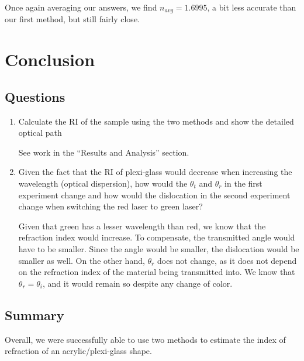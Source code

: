 \documentclass[
	letterpaper, %
	10pt, %
]{CSUniSchoolLabReport}
\begin{document}
Once again averaging our answers, we find $n_{avg}=1.6995$, a bit less accurate than our first method, but still fairly close.

\section{Conclusion}

\subsection{Questions}

\begin{enumerate}

  \item Calculate the RI of the sample using the two methods and show the detailed optical path

    See work in the ``Results and Analysis'' section.

  \item Given the fact that the RI of plexi-glass would decrease when increasing the wavelength (optical dispersion), how would the $\theta_t$ and $\theta_r$ in the first experiment change and how would the dislocation in the second experiment change when switching the red laser to green laser?

    Given that green has a lesser wavelength than red, we know that the refraction index would increase. To compensate, the transmitted angle would have to be smaller. Since the angle would be smaller, the dislocation would be smaller as well. On the other hand, $\theta_r$ does not change, as it does not depend on the refraction index of the material being transmitted into. We know that $\theta_r=\theta_i$, and it would remain so despite any change of color.

\end{enumerate}

\subsection{Summary}

Overall, we were successfully able to use two methods to estimate the index of refraction of an acrylic/plexi-glass shape.
\end{document}
